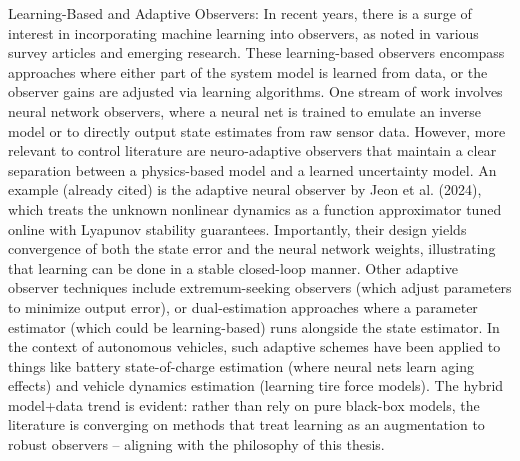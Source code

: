 Learning-Based and Adaptive Observers: In recent years, there is a surge of interest in incorporating machine learning into observers, as noted in various survey articles and emerging research. These learning-based observers encompass approaches where either part of the system model is learned from data, or the observer gains are adjusted via learning algorithms. One stream of work involves neural network observers, where a neural net is trained to emulate an inverse model or to directly output state estimates from raw sensor data. However, more relevant to control literature are neuro-adaptive observers that maintain a clear separation between a physics-based model and a learned uncertainty model. An example (already cited) is the adaptive neural observer by Jeon et al. (2024), which treats the unknown nonlinear dynamics as a function approximator tuned online with Lyapunov stability guarantees. Importantly, their design yields convergence of both the state error and the neural network weights, illustrating that learning can be done in a stable closed-loop manner. Other adaptive observer techniques include extremum-seeking observers (which adjust parameters to minimize output error), or dual-estimation approaches where a parameter estimator (which could be learning-based) runs alongside the state estimator. In the context of autonomous vehicles, such adaptive schemes have been applied to things like battery state-of-charge estimation (where neural nets learn aging effects) and vehicle dynamics estimation (learning tire force models). The hybrid model+data trend is evident: rather than rely on pure black-box models, the literature is converging on methods that treat learning as an augmentation to robust observers – aligning with the philosophy of this thesis.

